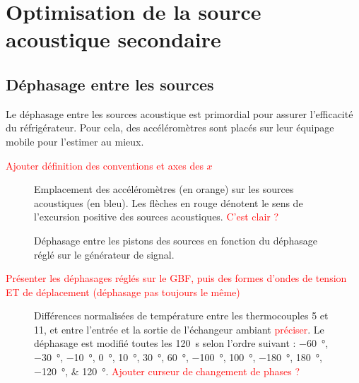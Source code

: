 \chapter{Optimisation de la source acoustique secondaire}

\section{Déphasage entre les sources}

Le déphasage entre les sources acoustique est primordial pour assurer l'efficacité du réfrigérateur. Pour cela, des accéléromètres sont placés sur leur équipage mobile pour l'estimer au mieux.  

\textcolor{red}{Ajouter définition des conventions et axes des $x$}

\begin{figure}[!ht]
    \centering
    
    \caption{Emplacement des accéléromètres (en \textcolor{PythonOrange}{orange}) sur les sources acoustiques (en \textcolor{PythonBlue}{bleu}). Les flèches en \textcolor{PythonRed}{rouge} dénotent le sens de l'excursion positive des sources acoustiques. \textcolor{red}{C'est clair ?}}
    \label{../fig:AcceleroDefinition}
\end{figure}

\begin{figure}[ht!]
    \centering
    
    \caption{Déphasage entre les pistons des sources en fonction du déphasage réglé sur le générateur de signal.}
    \label{fig:PhaseGBFOscPiston}
\end{figure}

\textcolor{red}{Présenter les déphasages réglés sur le GBF, puis des formes d'ondes de tension ET de déplacement (déphasage pas toujours le même)}

\begin{figure}
    \centering
    
    \caption{Différences normalisées de température entre les thermocouples 5 et 11, et entre l'entrée et la sortie de l'échangeur ambiant \textcolor{red}{préciser}. Le déphasage est modifié toutes les \qty{120}{\second} selon l'ordre suivant : \qtylist{-60;-30;-10;0;10;30;60;-100;100;-180;180;-120;120}{\degree}. \textcolor{red}{Ajouter curseur de changement de phases ?}}
    \label{fig:GradT_PhaseHP}
\end{figure}

